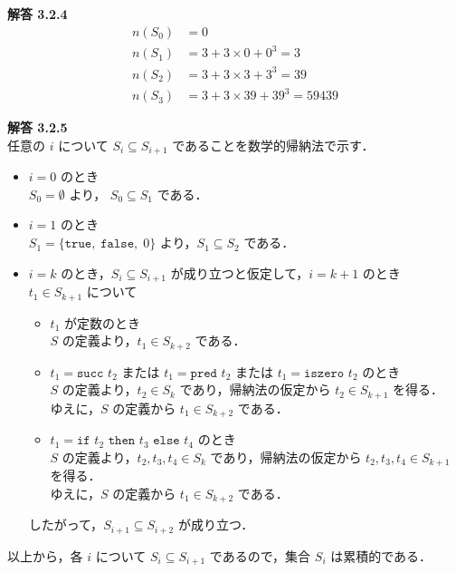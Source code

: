 \documentclass[a4paper,11pt,fleqn,dvipdfmx]{article}
\newcommand{\ansja}[1]{\noindent\textbf{解答 #1}\\[2mm]}
\begin{document}
    \ansja{3.2.4}
        \begin{align*}
            n(S_0) &= 0 \\
            n(S_1) &= 3 + 3 \times 0 + 0 ^ 3 = 3 \\
            n(S_2) &= 3 + 3 \times 3 + 3 ^ 3 = 39 \\
            n(S_3) &= 3 + 3 \times 39 + 39 ^ 3 = 59439
        \end{align*}

    \vspace{10mm}

    \ansja{3.2.5}
        任意の $i$ について $S_i \subseteq S_{i+1}$ であることを数学的帰納法で示す．
        \begin{itemize}
            \item $i=0$ のとき \\[2mm]
                $S_0 = \emptyset$ より， $S_0 \subseteq S_1$ である．
            \item $i=1$ のとき \\[2mm]
                $S_1 = \{\texttt{true}, \; \texttt{false}, \; 0\}$ より，$S_1 \subseteq S_2$ である．
            \item $i=k$ のとき，$S_i \subseteq S_{i+1}$ が成り立つと仮定して，$i=k+1$ のとき \\[2mm]
                $t_1 \in S_{k+1}$ について
                \begin{itemize}
                    \item $t_1$ が定数のとき \\[2mm]
                        $S$ の定義より，$t_1 \in S_{k+2}$ である．
                    \item $t_1 = \texttt{succ } t_2$ または $t_1 = \texttt{pred } t_2$ または $t_1 = \texttt{iszero } t_2$ のとき \\[2mm]
                        $S$ の定義より，$t_2 \in S_k$ であり，帰納法の仮定から $t_2 \in S_{k+1}$ を得る． \\
                        ゆえに，$S$ の定義から $t_1 \in S_{k+2}$ である．
                    \item $t_1 = \texttt{if } t_2 \texttt{ then } t_3 \texttt{ else } t_4$ のとき \\[2mm]
                        $S$ の定義より，$t_2, t_3, t_4 \in S_k$ であり，帰納法の仮定から $t_2, t_3, t_4 \in S_{k+1}$ を得る． \\
                        ゆえに，$S$ の定義から $t_1 \in S_{k+2}$ である．
                \end{itemize}
                したがって，$S_{i+1} \subseteq S_{i+2}$ が成り立つ．
        \end{itemize}
        以上から，各 $i$ について $S_i \subseteq S_{i+1}$ であるので，集合 $S_i$ は累積的である．
\end{document}
